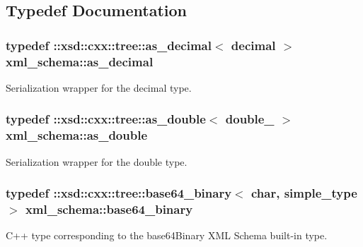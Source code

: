 \subsection{Typedef Documentation}
\hypertarget{namespacexml__schema_a60dfdca63dedf12d8a524c0496def693}{}
\subsubsection[{as\+\_\+decimal}]{\setlength{\rightskip}{0pt plus 5cm}typedef \+::xsd\+::cxx\+::tree\+::as\+\_\+decimal$<$ {\bf decimal} $>$ {\bf xml\+\_\+schema\+::as\+\_\+decimal}}\label{namespacexml__schema_a60dfdca63dedf12d8a524c0496def693}


Serialization wrapper for the decimal type. 

\hypertarget{namespacexml__schema_ae0eab1db5641db3b286a63a0ebe40351}{}
\subsubsection[{as\+\_\+double}]{\setlength{\rightskip}{0pt plus 5cm}typedef \+::xsd\+::cxx\+::tree\+::as\+\_\+double$<$ {\bf double\+\_\+} $>$ {\bf xml\+\_\+schema\+::as\+\_\+double}}\label{namespacexml__schema_ae0eab1db5641db3b286a63a0ebe40351}


Serialization wrapper for the double type. 

\hypertarget{namespacexml__schema_a4d35d3537187e95237936654b31ba164}{}
\subsubsection[{base64\+\_\+binary}]{\setlength{\rightskip}{0pt plus 5cm}typedef \+::xsd\+::cxx\+::tree\+::base64\+\_\+binary$<$ char, {\bf simple\+\_\+type} $>$ {\bf xml\+\_\+schema\+::base64\+\_\+binary}}\label{namespacexml__schema_a4d35d3537187e95237936654b31ba164}


C++ type corresponding to the base64\+Binary X\+M\+L Schema built-\/in type. 

\hypertarget{namespacexml__schema_ae5ada4ec9c54b51765c3e4c0e9631bba}{}
